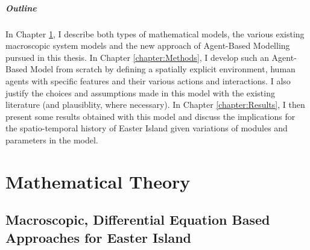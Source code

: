 \paragraph{Outline}
In Chapter \ref{chapter:Theory}, I describe both types of mathematical models, the various existing macroscopic system models and the new approach of Agent-Based Modelling pursued in this thesis.
In Chapter \ref{chapter:Methods}, I develop such an Agent-Based Model from scratch by defining a spatially explicit environment, human agents with specific features and their various actions and interactions. 
I also justify the choices and assumptions made in this model with the existing literature (and plausiblity, where necessary).
In Chapter \ref{chapter:Results}, I then present some results obtained with this model and discuss the implications for the spatio-temporal history of Easter Island given variations of modules and parameters in the model.

\chapter{Mathematical Theory}\label{chapter:Theory}
\FloatBarrier
\section{Macroscopic, Differential Equation Based Approaches for Easter Island}

